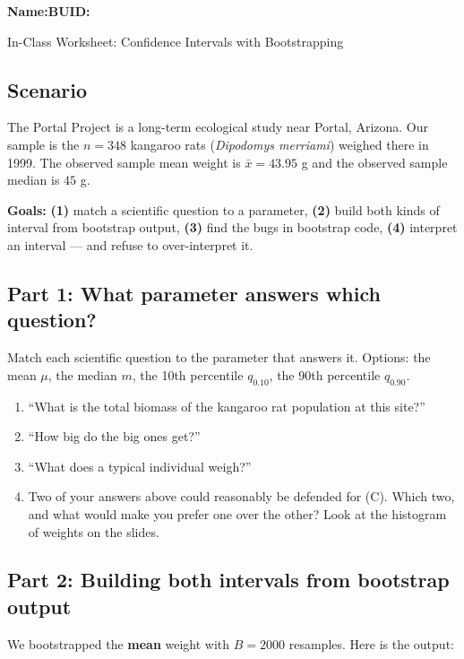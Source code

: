 \documentclass{article}
\newcommand{\blankline}[1]{\underline{\hspace{#1}}}
\begin{document}
\noindent\textbf{Name:}\blankline{2.25in}\hfill\textbf{BUID:}\blankline{1.55in}\newline

\begin{center}
 \Large In-Class Worksheet: Confidence Intervals with Bootstrapping
\end{center}

\subsection*{Scenario}
The Portal Project is a long-term ecological study near Portal, Arizona. Our sample is the $n=348$ kangaroo rats (\textit{Dipodomys merriami}) weighed there in 1999. The observed sample mean weight is $\bar{x}=43.95$ g and the observed sample median is $45$ g.

\medskip
\noindent\textbf{Goals:} \textbf{(1)} match a scientific question to a parameter, \textbf{(2)} build both kinds of interval from bootstrap output, \textbf{(3)} find the bugs in bootstrap code, \textbf{(4)} interpret an interval --- and refuse to over-interpret it.

\newpage

\subsection*{Part 1: What parameter answers which question?}
Match each scientific question to the parameter that answers it. Options: the mean $\mu$, the median $m$, the 10th percentile $q_{0.10}$, the 90th percentile $q_{0.90}$.

\begin{enumerate}[label={\bfseries (\Alph*)},itemsep=.8em]
\item ``What is the total biomass of the kangaroo rat population at this site?'' \hfill \blankline{1.2in}
\item ``How big do the big ones get?'' \hfill \blankline{1.2in}
\item ``What does a typical individual weigh?'' \hfill \blankline{1.2in}
\item Two of your answers above could reasonably be defended for (C). Which two, and what would make you prefer one over the other? Look at the histogram of weights on the slides. \\[5em]
\end{enumerate}

\subsection*{Part 2: Building both intervals from bootstrap output}
We bootstrapped the \textbf{mean} weight with $B=2000$ resamples. Here is the output:
\end{document}
